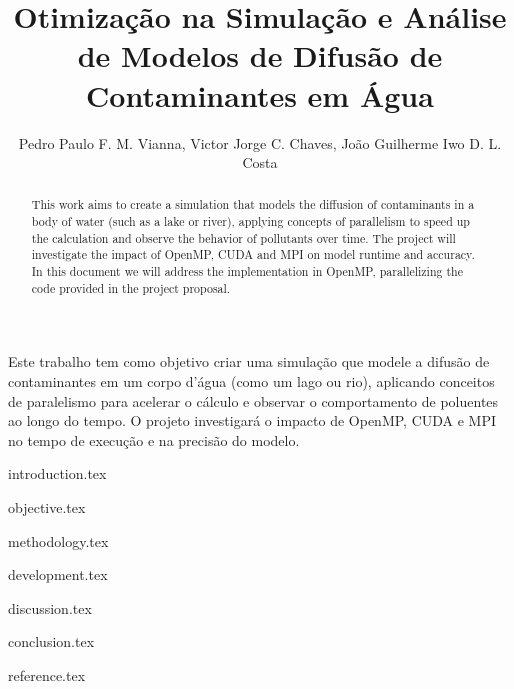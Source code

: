 \documentclass[12pt]{article}
\title{Otimização na Simulação e Análise de Modelos de Difusão de Contaminantes em Água}
\author{Pedro Paulo F. M. Vianna, Victor Jorge C. Chaves, João Guilherme Iwo D. L. Costa }
\begin{document}
\maketitle

\begin{abstract}
  This work aims to create a simulation that models the diffusion of contaminants in a body of water (such as a lake or river), applying concepts of parallelism to speed up the calculation and observe the behavior of pollutants over time. The project will investigate the impact of OpenMP, CUDA and MPI on model runtime and accuracy. In this document we will address the implementation in OpenMP, parallelizing the code provided in the project proposal.
\end{abstract}

\begin{resumo}
  Este trabalho tem como objetivo criar uma simulação que modele a difusão de contaminantes em um corpo d'água (como um lago ou rio), aplicando conceitos de paralelismo para acelerar o cálculo e observar o comportamento de poluentes ao longo do tempo. O projeto investigará o impacto de OpenMP, CUDA e MPI no tempo de execução e na precisão do modelo.
\end{resumo}

{introduction.tex}

{objective.tex}

{methodology.tex}

{development.tex}

{discussion.tex}

{conclusion.tex}

{reference.tex}
\end{document}
